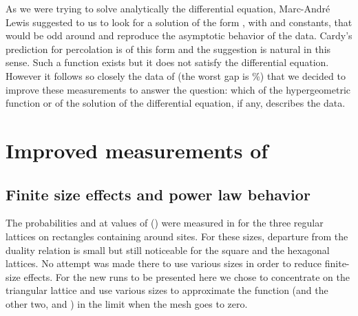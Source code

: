 \documentclass[a4paper,12pt]{article}
\begin{document}
As we were trying to solve analytically the differential equation, Marc-Andr\'e
Lewis suggested to us to look for a solution of the form 
\coordHE{}, with \coordHE{} and \coordHE{} constants, that would be
odd around \coordHE{} and reproduce the asymptotic behavior of the data.
Cardy's prediction for percolation is of this form and the suggestion is natural
in this sense. Such a function exists but it does not satisfy the differential
equation. However it follows so closely the data of \cite{LLS} (the worst
gap is \coordHE{}\%) that we decided to improve these measurements to answer the
question: which of the hypergeometric function or of the solution of the
differential equation, if any, describes the data.


\section{Improved measurements of \coordHE{}}

\subsection{Finite size effects and power law behavior}

The probabilities \coordHE{} and \coordHE{} at \coordHE{} values
of \coordHE{} (\myHighlight{$\in[0.136,7.351]$}\coordHE{})
were measured in \cite{LLS} for the three regular lattices on rectangles
containing around \coordHE{} sites. For these sizes, departure from the
duality relation is small but still noticeable for the square and the
hexagonal lattices. No attempt was made there to use various sizes in order to 
reduce finite-size effects. For the new runs to be presented here we
chose to concentrate on the triangular lattice and use various sizes
to approximate the function \coordHE{} (and the other two, \coordHE{} and \coordHE{}) in the
limit when the mesh goes to zero.
\end{document}
